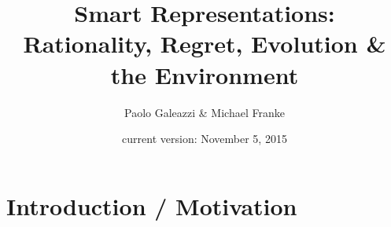\documentclass[fleqn,reqno,11pt]{article}
\title{Smart Representations: {R}ationality, Regret, Evolution \& the Environment}
\author{Paolo Galeazzi \& Michael Franke} \date{current version: November 5, 2015}
\newcommand{\myalert}[1]{\textcolor{red}{#1}}
\begin{document}




\maketitle

\section{Introduction / Motivation}
\label{sec:intr--motiv}
\end{document}
